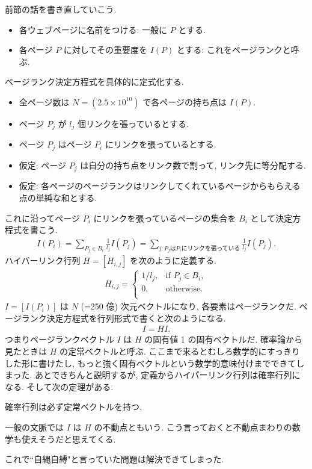 \documentclass[openany, a4paper, oneside]{jsbook}
\begin{document}
{前節の話を書き直していこう.
\begin{itemize}
\item 各ウェブページに名前をつける: 一般に $P$ とする.
\item 各ページ $P$ に対してその重要度を $I (P)$ とする: これをページランクと呼ぶ.
\end{itemize}
ページランク決定方程式を具体的に定式化する.
\begin{itemize}
\item 全ページ数は $N = (2.5 \times 10^{10})$ で各ページの持ち点は $I(P)$.
\item ページ $P_j$ が $l_j$ 個リンクを張っているとする.
\item ページ $P_j$ はページ $P_i$ にリンクを張っているとする.
\item 仮定: ページ $P_j$ は自分の持ち点をリンク数で割って, リンク先に等分配する.
\item 仮定: 各ページのページランクはリンクしてくれているページからもらえる点の単純な和とする.
\end{itemize}
これに沿ってページ $P_i$ にリンクを張っているページの集合を $B_i$ として決定方程式を書こう.
\begin{align}
 I (P_i)
 =
 \sum_{P_j \in B_i} \frac{ 1 }{ l_j }I (P_j)
 =
 \sum_{j:P_j \text{は} P_i \text{にリンクを張っている}}\frac{ 1 }{ l_j }I (P_j).
\end{align}
ハイバーリンク行列 $H=[H_{i,j}]$ を次のように定義する.
\begin{align}
 H_{i,j}
 =
 \begin{cases}
 1/l_j, & \text{if } P_j \in B_i, \\
 0, & \text{otherwise}. \\
 \end{cases} \label{linear-algebra-google-pagerank5}
\end{align}
$I=[I (P_i)]$ は $N$ (=250 億) 次元ベクトルになり, 各要素はページランクだ.
ページランク決定方程式を行列形式で書くと次のようになる.
\begin{align}
 I
 =
 HI. \label{linear-algebra-google-pagerank6}
\end{align}
つまりページランクベクトル $I$ は $H$ の固有値 1 の固有ベクトルだ.
確率論から見たときは $H$ の定常ベクトルと呼ぶ.
ここまで来るとむしろ数学的にすっきりした形に書けたし,
もっと強く固有ベクトルという数学的意味付けまでできてしまった.
あとできちんと説明するが, 定義からハイパーリンク行列は確率行列になる\footnotemark.
そして次の定理がある.
\begin{thm}
確率行列は必ず定常ベクトルを持つ.
\end{thm}
\begin{rem}
一般の文脈では $I$ は $H$ の不動点ともいう.
こう言っておくと不動点まわりの数学も使えそうだと思えてくる.
\end{rem}
これで``自縄自縛"と言っていた問題は解決できてしまった.}
\end{document}
